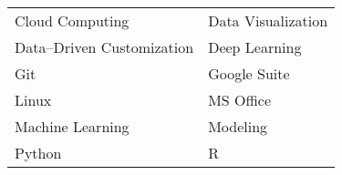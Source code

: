 \begin{center}
    \begin{tabular}{ m{5cm} m{5cm} }
        Cloud Computing            &
        Data Visualization           \\
        Data--Driven Customization &
        Deep Learning                \\
        Git                        &
        Google Suite                 \\
        Linux                      &
        MS Office                    \\
        Machine Learning           &
        Modeling                     \\
        Python                     &
        R
    \end{tabular}
\end{center}